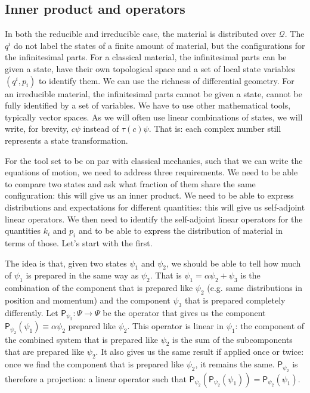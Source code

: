 \documentclass[smallextended]{svjour3}
\numberwithin{equation}{section}
\theoremstyle{definition}
\begin{document}
\subsection{Inner product and operators}

In both the reducible and irreducible case, the material is distributed over $\mathcal{Q}$. The $q^i$ do not label the states of a finite amount of material, but the configurations for the infinitesimal parts. For a classical material, the infinitesimal parts can be given a state, have their own topological space and a set of local state variables $(q^i, p_i)$ to identify them. We can use the richness of differential geometry. For an irreducible material, the infinitesimal parts cannot be given a state, cannot be fully identified by a set of variables. We have to use other mathematical tools, typically vector spaces. As we will often use linear combinations of states, we will write, for brevity, $c\psi$ instead of $\tau(c)\psi$. That is: each complex number still represents a state transformation.

For the tool set to be on par with classical mechanics, such that we can write the equations of motion, we need to address three requirements. We need to be able to compare two states and ask what fraction of them share the same configuration: this will give us an inner product. We need to be able to express distributions and expectations for different quantities: this will give us self-adjoint linear operators. We then need to identify the self-adjoint linear operators for the quantities $k_i$ and $p_i$ and to be able to express the distribution of material in terms of those. Let's start with the first.

The idea is that, given two states $\psi_1$ and $\psi_2$, we should be able to tell how much of $\psi_1$ is prepared in the same way as $\psi_2$. That is $\psi_1 = \alpha \psi_2 + \psi_3$ is the combination of the component that is prepared like $\psi_2$ (e.g. same distributions in position and momentum) and the component $\psi_3$ that is prepared completely differently. Let $\mathsf{P}_{\psi_2} : \Psi \rightarrow \Psi$ be the operator that gives us the component $\mathsf{P}_{\psi_2} (\psi_1) \equiv \alpha \psi_2$ prepared like $\psi_2$. This operator is linear in $\psi_1$: the component of the combined system that is prepared like $\psi_2$ is the sum of the subcomponents that are prepared like $\psi_2$. It also gives us the same result if applied once or twice: once we find the component that is prepared like $\psi_2$, it remains the same. $\mathsf{P}_{\psi_2}$ is therefore a projection: a linear operator such that $\mathsf{P}_{\psi_2}(\mathsf{P}_{\psi_2} (\psi_1))= \mathsf{P}_{\psi_2} (\psi_1)$.
\end{document}
